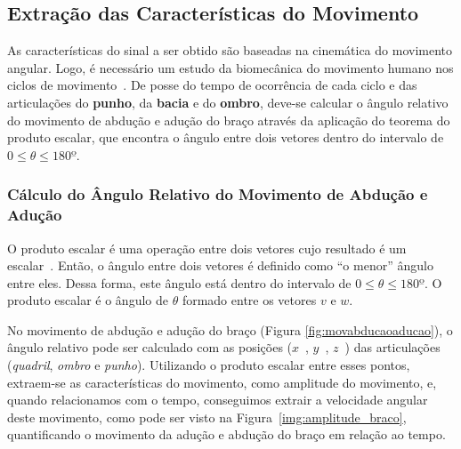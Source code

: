\subsection{Extração das Características do Movimento} \label{sec:extracao_caracteristcas}
As características do sinal a ser obtido são baseadas na cinemática do movimento angular. Logo, é necessário um estudo da biomecânica do movimento humano nos ciclos de movimento~\cite{hamill1999bases}. De posse do tempo de ocorrência de cada ciclo e das articulações do \textbf{punho}, da \textbf{bacia} e do \textbf{ombro}, deve-se calcular o ângulo relativo do movimento de abdução e adução do braço através da aplicação do teorema do produto escalar, que encontra o ângulo entre dois vetores dentro do intervalo de $0 \leq \theta \leq 180º$.

\subsubsection{Cálculo do Ângulo Relativo do Movimento de Abdução e Adução}\label{section:movimento_abducao}
O produto escalar é uma operação entre dois vetores cujo resultado é um escalar~\cite{algebra2000}. Então, o ângulo entre dois vetores é definido como ``o menor'' ângulo entre eles. Dessa forma, este ângulo está dentro do intervalo de $0 \leq \theta \leq 180º $. O produto escalar é o ângulo de $ \theta$ formado entre os vetores $ v $ e $ w $.


% 
% 

No movimento de abdução e adução do braço (Figura \ref{fig:movabducaoaducao}), o ângulo relativo pode ser calculado com as posições ($ x $\ ,  $ y $\ , $ z $\ ) das articulações (\textit{quadril}, \textit{ombro} e \textit{punho}). Utilizando o produto escalar entre esses pontos, extraem-se as características do movimento, como amplitude do movimento, e, quando relacionamos com o tempo, conseguimos extrair a velocidade angular deste movimento, como pode ser visto na Figura~\ref{img:amplitude_braco}, quantificando o movimento da adução e abdução do braço em relação ao tempo.


